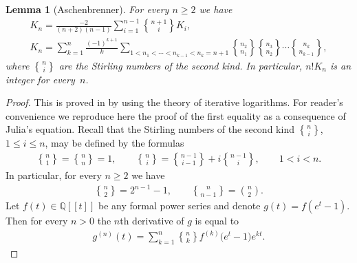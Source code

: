 \documentclass[pdftex]{sigma}
\newcommand{\stirl}[2]{\genfrac{\{}{\}}{0pt}{}{#1}{#2}}
\newcommand{\Q}{\mathbb{Q}}
\numberwithin{equation}{section}
\newtheorem{Lemma}[Theorem]{Lemma}
 { \theoremstyle{definition}
\newtheorem{Definition}[Theorem]{Definition}
\newtheorem{Example}[Theorem]{Example}
\newtheorem{Remark}[Theorem]{Remark} }
\begin{document}
\begin{Lemma}[Aschenbrenner]\label{lem.aschelemma}
For every $n\ge 2$ we have
\begin{gather*}
K_n =\frac{-2}{(n+2)(n-1)}\sum_{i=1}^{n-1} \stirl{n+1}{i}K_i ,\\
K_{n} =\sum_{k=1}^n\frac{(-1)^{k+1}}{k}\sum_{1<n_1<\cdots<n_{k-1}<n_k=n+1}
\stirl{n_2}{n_1} \stirl{n_3}{n_2} \cdots \stirl{n_k}{n_{k-1}} ,
\end{gather*}
where $\stirl{n}{i}$ are the Stirling numbers of the second kind. In particular, $n!K_n$ is an integer for every~$n$.
\end{Lemma}

\begin{proof} This is proved in \cite[Section~7]{Asche} by using the theory of iterative logarithms. For reader's convenience we reproduce here the proof of the f\/irst equality as a consequence of Julia's equation.
Recall that the Stirling numbers of the second kind $\stirl{n}{i}$, $1\le i\le n$, may be def\/ined by the formulas
\begin{gather*}\stirl{n}{1}=\stirl{n}{n}=1,\qquad
\stirl{n}{i}=\stirl{n-1}{i-1}+i\stirl{n-1}{i},\qquad 1<i<n .\end{gather*}
In particular, for every $n\ge 2$ we have
\begin{gather*}
\stirl{n}{2}=2^{n-1}-1,\qquad \stirl{n}{n-1}=\binom{n}{2}.\end{gather*}
Let $f(t)\in \Q[[t]]$ be any formal power series and denote $g(t)=f(e^t-1)$. Then for every $n>0$ the $n$th derivative of $g$ is equal to
\begin{gather}\label{equ.equ.stirlingandderivata}
g^{(n)}(t)=\sum_{k=1}^n \stirl{n}{k} f^{(k)}\big(e^t-1\big)e^{kt} .
\end{gather}


\end{proof}
\end{document}
